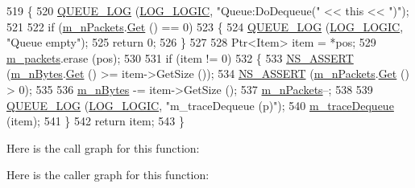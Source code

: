 \begin{DoxyCode}
519 \{
520   \hyperlink{queue_8h_a19c551c8381c44dfa7d429a1788ede3a}{QUEUE\_LOG} (\hyperlink{namespacens3_aa6464a4d69551a9cc968e17a65f39bdbad960c03edfbfa929248b88c0f974a555}{LOG\_LOGIC}, \textcolor{stringliteral}{"Queue:DoDequeue("} << \textcolor{keyword}{this} << \textcolor{stringliteral}{")"});
521 
522   \textcolor{keywordflow}{if} (\hyperlink{classns3_1_1QueueBase_a1b9e3767ab060e792378c35ef7a67427}{m\_nPackets}.\hyperlink{classns3_1_1TracedValue_a10fddd1de961ac65acfbeb440a1e8551}{Get} () == 0)
523     \{
524       \hyperlink{queue_8h_a19c551c8381c44dfa7d429a1788ede3a}{QUEUE\_LOG} (\hyperlink{namespacens3_aa6464a4d69551a9cc968e17a65f39bdbad960c03edfbfa929248b88c0f974a555}{LOG\_LOGIC}, \textcolor{stringliteral}{"Queue empty"});
525       \textcolor{keywordflow}{return} 0;
526     \}
527 
528   Ptr<Item> item = *pos;
529   \hyperlink{classns3_1_1Queue_a7566add06f61f79cc571ee4822a8bd69}{m\_packets}.erase (pos);
530 
531   \textcolor{keywordflow}{if} (item != 0)
532     \{
533       \hyperlink{assert_8h_a6dccdb0de9b252f60088ce281c49d052}{NS\_ASSERT} (\hyperlink{classns3_1_1QueueBase_ac6294a28b80d4039bb4a0c8a336ed1fe}{m\_nBytes}.\hyperlink{classns3_1_1TracedValue_a10fddd1de961ac65acfbeb440a1e8551}{Get} () >= item->GetSize ());
534       \hyperlink{assert_8h_a6dccdb0de9b252f60088ce281c49d052}{NS\_ASSERT} (\hyperlink{classns3_1_1QueueBase_a1b9e3767ab060e792378c35ef7a67427}{m\_nPackets}.\hyperlink{classns3_1_1TracedValue_a10fddd1de961ac65acfbeb440a1e8551}{Get} () > 0);
535 
536       \hyperlink{classns3_1_1QueueBase_ac6294a28b80d4039bb4a0c8a336ed1fe}{m\_nBytes} -= item->GetSize ();
537       \hyperlink{classns3_1_1QueueBase_a1b9e3767ab060e792378c35ef7a67427}{m\_nPackets}--;
538 
539       \hyperlink{queue_8h_a19c551c8381c44dfa7d429a1788ede3a}{QUEUE\_LOG} (\hyperlink{namespacens3_aa6464a4d69551a9cc968e17a65f39bdbad960c03edfbfa929248b88c0f974a555}{LOG\_LOGIC}, \textcolor{stringliteral}{"m\_traceDequeue (p)"});
540       \hyperlink{classns3_1_1Queue_acba7318200df563f801b26677163df6e}{m\_traceDequeue} (item);
541     \}
542   \textcolor{keywordflow}{return} item;
543 \}
\end{DoxyCode}


Here is the call graph for this function\+:




Here is the caller graph for this function\+:


